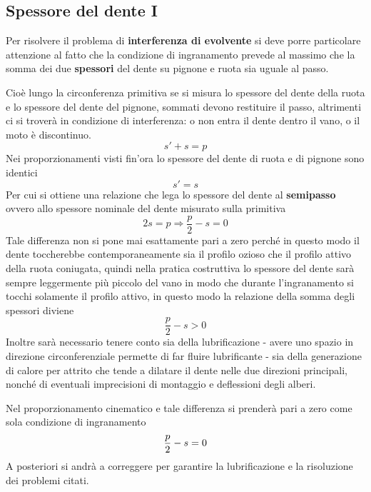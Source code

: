 \documentclass[a4paper, 15pt]{article}
\begin{document}
\subsection{Spessore del dente I}
\begin{adjustwidth}{2in}{}		
		Per risolvere il problema di \textbf{interferenza di evolvente} si deve porre particolare attenzione al fatto che la condizione di ingranamento prevede al massimo che la somma dei due \textbf{spessori} del dente su pignone e ruota sia uguale al passo.
		
		Cioè lungo la circonferenza primitiva se si misura lo spessore del dente della ruota e lo spessore del dente del pignone, sommati devono restituire il passo, altrimenti ci si troverà in condizione di interferenza: o non entra il dente dentro il vano, o il moto è discontinuo.
		\[s'+s = p\]		
		Nei proporzionamenti visti fin'ora lo spessore del dente di ruota e di pignone sono identici
		\[s'= s\] 
		Per cui si ottiene una relazione che lega lo spessore del dente al \textbf{semipasso} ovvero allo spessore nominale del dente misurato sulla primitiva
		\[2s = p \Rightarrow \dfrac{p}{2}-s=0\]
		Tale differenza non si pone mai esattamente pari a zero perché in questo modo il dente toccherebbe contemporaneamente sia il profilo ozioso che il profilo attivo della ruota coniugata, quindi nella pratica costruttiva lo spessore del dente sarà sempre leggermente più piccolo del vano in modo che durante l'ingranamento si tocchi solamente il profilo attivo, in questo modo la relazione della somma degli spessori diviene
		\[\dfrac{p}{2}-s>0\]
		Inoltre sarà necessario tenere conto sia della lubrificazione - avere uno spazio in direzione circonferenziale permette di far fluire lubrificante - sia della generazione di calore per attrito che tende a dilatare il dente nelle due direzioni principali, nonché di eventuali imprecisioni di montaggio e deflessioni degli alberi.\newline 
		
		Nel proporzionamento cinematico e tale differenza si prenderà pari a zero come sola condizione di ingranamento
		\[{p\over2}-s=0\] A posteriori si andrà a correggere per garantire la lubrificazione e la risoluzione dei problemi citati. 
\end{adjustwidth}
\end{document}
